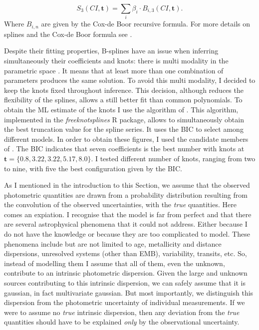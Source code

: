 \begin{equation}
S_3(CI,\mathbf{t}) = \sum_i \beta_i\cdot B_{i,3}(CI,\mathbf{t}).
\end{equation}
Where $B_{i,n}$ are given by the Cox-de Boor recursive formula. For more details on splines and the Cox-de Boor formula see \citet{deBoor1978}.

Despite their fitting properties, B-splines have an issue when inferring simultaneously their coefficients and knots: there is multi modality in the parametric space \citep{Lindstrom1999}. It means that at least more than one combination of parameters produces the same solution. To avoid this multi modality, I decided to keep the knots fixed throughout inference. This decision, although reduces the flexibility of the splines, allows a still better fit than common polynomials. To obtain the ML estimate of the knots I use the algorithm of  \citet{Spiriti2013}. This algorithm, implemented in the \emph{freeknotsplines} R package, allows to simultaneously obtain the best truncation value for the spline series. It uses the BIC to select among different models. In order to obtain these figures, I used the candidate members of \citet{Bouy2015}. The BIC indicates that seven coefficients is the best number with knots at $\mathbf{t}=\{0.8,3.22,3.22,5.17,8.0\}$. I tested different number of knots, ranging from two to nine, with five the best configuration given by the BIC. 

As I mentioned in the introduction to this Section, we assume that the observed photometric quantities are drawn from a probability distribution resulting from the convolution of the observed uncertainties, with the \emph{true} quantities. Here comes an expiation. I recognise that the model is far from perfect and that there are several astrophysical phenomena that it could not address. Either because I do not have the knowledge or because they are too complicated to model. These phenomena include but are not limited to age, metallicity and distance dispersions, unresolved systems (other than EMB), variability, transits, etc. So, instead of modelling them I assume that all of them, even the unknown, contribute to an intrinsic photometric dispersion. Given the large and unknown sources contributing to this intrinsic dispersion, we can safely assume that it is gaussian, in fact multivariate gaussian. But most importantly, we distinguish this dispersion from the photometric uncertainty of individual measurements. If we were to assume no \emph{true} intrinsic dispersion, then any deviation from the \emph{true} quantities should have to be explained \emph{only} by the observational uncertainty. 

